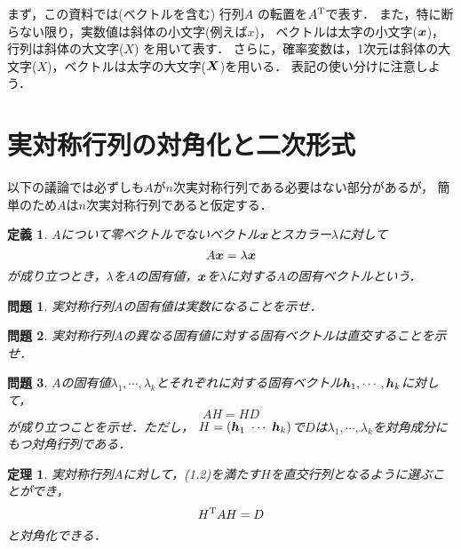 \documentclass[11pt,ascmac]{jsarticle}
\newtheorem{df}{\bf 定義}[section]
\newtheorem{thm}{\bf 定理}[section]
\newtheorem{pr}{\bf 問題}[section]
\newcommand{\vx}{\mbox{{\boldmath $x$}}}
\newcommand{\vX}{\mbox{{\boldmath $X$}}}
\newcommand{\vh}{\mbox{{\boldmath $h$}}}
\begin{document}


\begin{shadebox}
まず，この資料では(ベクトルを含む) 行列$A$ の転置を$A^{\rm T}$で表す．
また，特に断らない限り，実数値は斜体の小文字(例えば$x$)，
ベクトルは太字の小文字($\vx$)，行列は斜体の大文字($X$) を用いて表す．
さらに，確率変数は，1次元は斜体の大文字($X$)，ベクトルは太字の大文字($\vX$)を用いる．
表記の使い分けに注意しよう．
\end{shadebox}

\section{実対称行列の対角化と二次形式}

以下の議論では必ずしも$A$が$n$次実対称行列である必要はない部分があるが，
簡単のため$A$は$n$次実対称行列であると仮定する．

\begin{df}
$A$について零ベクトルでないベクトル$\vx$とスカラー$\lambda$に対して
\begin{equation}
A\vx=\lambda\vx
\end{equation}
が成り立つとき，$\lambda$を$A$の固有値，$\vx$を$\lambda$に対する$A$の固有ベクトルという．
\end{df}

\begin{pr}
実対称行列$A$の固有値は実数になることを示せ．
\end{pr}

\begin{pr}
実対称行列$A$の異なる固有値に対する固有ベクトルは直交することを示せ．
\end{pr}

\begin{pr}
$A$の固有値$\lambda_1,\cdots,\lambda_k$とそれぞれに対する固有ベクトル$\vh_1,\cdots,\vh_k$に対して，
\begin{equation}
AH=HD
\end{equation}
が成り立つことを示せ．ただし，
$H=(\vh_1~\cdots~\vh_k)$で$D$は$\lambda_1,\cdots,\lambda_k$を対角成分にもつ対角行列である．
\end{pr}

\begin{thm}
実対称行列$A$に対して，(1.2)を満たす$H$を直交行列となるように選ぶことができ，
\begin{equation}
H^{\rm T}AH=D
\end{equation}
と対角化できる．
\end{thm}
\end{document}
